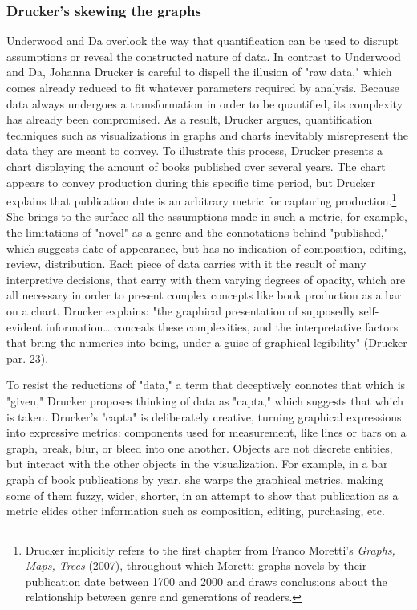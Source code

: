 \documentclass[11pt]{article}
\begin{document}
\subsubsection{Drucker's skewing the graphs}
\label{sec:org7d36620}

Underwood and Da overlook the way that quantification can be used to
disrupt assumptions or reveal the constructed nature of data. In
contrast to Underwood and Da, Johanna Drucker is careful to dispell
the illusion of "raw data," which comes already reduced to fit
whatever parameters required by analysis. Because data always
undergoes a transformation in order to be quantified, its complexity
has already been compromised. As a result, Drucker argues,
quantification techniques such as visualizations in graphs and charts
inevitably misrepresent the data they are meant to convey. To
illustrate this process, Drucker presents a chart displaying the
amount of books published over several years. The chart appears to
convey production during this specific time period, but Drucker
explains that publication date is an arbitrary metric for capturing
production.\footnote{Drucker implicitly refers to the first chapter from Franco
Moretti's \emph{Graphs, Maps, Trees} (2007), throughout which Moretti
graphs novels by their publication date between 1700 and 2000 and
draws conclusions about the relationship between genre and generations
of readers.} She brings to the surface all the assumptions made
in such a metric, for example, the limitations of "novel" as a genre
and the connotations behind "published," which suggests date of
appearance, but has no indication of composition, editing, review,
distribution. Each piece of data carries with it the result of many
interpretive decisions, that carry with them varying degrees of
opacity, which are all necessary in order to present complex concepts
like book production as a bar on a chart. Drucker explains: "the
graphical presentation of supposedly self-evident
information\ldots{} conceals these complexities, and the interpretative
factors that bring the numerics into being, under a guise of graphical
legibility" (Drucker par. 23).

To resist the reductions of "data," a term that deceptively connotes
that which is "given," Drucker proposes thinking of data as "capta,"
which suggests that which is taken. Drucker's "capta" is deliberately
creative, turning graphical expressions into expressive metrics:
components used for measurement, like lines or bars on a graph, break,
blur, or bleed into one another. Objects are not discrete entities,
but interact with the other objects in the visualization. For example,
in a bar graph of book publications by year, she warps the graphical
metrics, making some of them fuzzy, wider, shorter, in an attempt to
show that publication as a metric elides other information such as
composition, editing, purchasing, etc.
\end{document}
